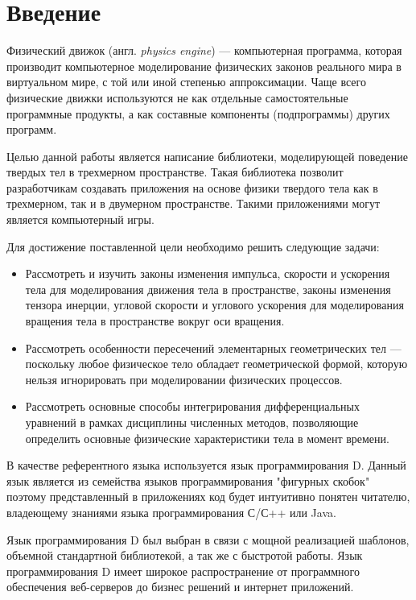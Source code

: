 \chapter*{Введение}	%
Физический движок (англ. \textit{physics engine}) --- компьютерная программа, которая производит
компьютерное моделирование физических законов реального мира в виртуальном мире,
с той или иной степенью аппроксимации. Чаще всего физические движки используются не как отдельные 
самостоятельные программные продукты, а как составные компоненты (подпрограммы) других программ.


Целью данной работы является написание библиотеки, моделирующей поведение твердых тел в трехмерном пространстве. 
Такая библиотека позволит разработчикам создавать приложения на основе физики твердого тела как в трехмерном, так и 
в двумерном пространстве. Такими приложениями могут является компьютерный игры.

Для достижение поставленной цели необходимо решить следующие задачи:%
\begin{itemize}
  \item Рассмотреть и изучить законы изменения импульса, скорости и ускорения тела для моделирования
  движения тела в пространстве, законы изменения тензора инерции, угловой скорости и углового ускорения 
  для моделирования вращения тела в пространстве вокруг оси вращения.

  \item Рассмотреть особенности пересечений элементарных геометрических тел --- поскольку любое физическое тело обладает 
  геометрической формой, которую нельзя игнорировать при моделировании физических процессов.

  \item Рассмотреть основные способы интегрирования дифференциальных уравнений в рамках дисциплины численных методов, 
  позволяющие определить основные физические характеристики тела в момент времени.
\end{itemize}

В качестве референтного языка используется язык программирования D.
Данный язык является из семейства языков программирования "фигурных скобок"
поэтому представленный в приложениях код будет интуитивно понятен читателю,
владеющему знаниями языка программирования С/С++ или Java.

Язык программирования D был выбран в связи с мощной реализацией шаблонов,
объемной стандартной библиотекой, а так же с быстротой работы.
Язык программирования D имеет широкое распространение от программного обеспечения веб-серверов
до бизнес решений и интернет приложений.
